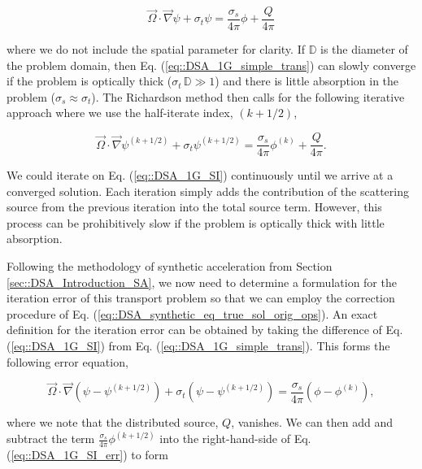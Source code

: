 \begin{equation}
\label{eq::DSA_1G_simple_trans}
\vec{\Omega} \cdot \vec{\nabla} \psi + \sigma_t \psi =  \frac{ \sigma_s}{4 \pi} \phi + \frac{Q}{4 \pi}
\end{equation}

\noindent where we do not include the spatial parameter for clarity. If $\mathbb{D}$ is the diameter of the problem domain, then Eq. (\ref{eq::DSA_1G_simple_trans}) can slowly converge if the problem is optically thick ($ \sigma_t \, \mathbb{D} \gg 1$) and there is little absorption in the problem ($\sigma_s \approx \sigma_t$). The Richardson method then calls for the following iterative approach where we use the half-iterate index, ${(k+1/2)}$,

\begin{equation}
\label{eq::DSA_1G_SI}
\vec{\Omega} \cdot \vec{\nabla} \psi^{(k+1/2)} + \sigma_t \psi^{(k+1/2)} =   \frac{ \sigma_s}{4 \pi} \phi^{(k)} + \frac{Q}{4 \pi}. 
\end{equation}

\noindent We could iterate on Eq. (\ref{eq::DSA_1G_SI}) continuously until we arrive at a converged solution. Each iteration simply adds the contribution of the scattering source from the previous iteration into the total source term. However, this process can be prohibitively slow if the problem is optically thick with little absorption. 

Following the methodology of synthetic acceleration from Section \ref{sec::DSA_Introduction_SA}, we now need to determine a formulation for the iteration error of this transport problem so that we can employ the correction procedure of Eq. (\ref{eq::DSA_synthetic_eq_true_sol_orig_ops}). An exact definition for the iteration error can be obtained by taking the difference of Eq. (\ref{eq::DSA_1G_SI}) from Eq. (\ref{eq::DSA_1G_simple_trans}). This forms the following error equation,

\begin{equation}
\label{eq::DSA_1G_SI_err}
\vec{\Omega} \cdot \vec{\nabla} \left( \psi - \psi^{(k+1/2)} \right) + \sigma_t \left( \psi -  \psi^{(k+1/2)}\right) =   \frac{ \sigma_s}{4 \pi} \left( \phi -  \phi^{(k)}\right)  ,
\end{equation}

\noindent where we note that the distributed source, $Q$, vanishes. We can then add and subtract the term $ \frac{ \sigma_s}{4 \pi} \phi^{(k+1/2)}$ into the right-hand-side of Eq. (\ref{eq::DSA_1G_SI_err}) to form 

